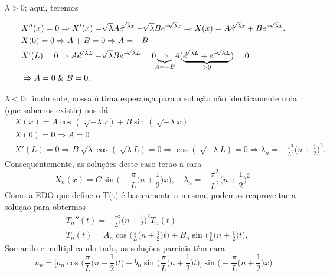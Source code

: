 \documentclass[../pde_notes.tex]{subfiles}
\begin{document}
\underline{\(\lambda > 0\)}: aqui, teremos

\begin{align*}
	 & X''(x) = 0 \Rightarrow X'(x) = \sqrt[]{\lambda }Ae^{\sqrt[]{\lambda }x} - \sqrt[]{\lambda }Be^{-\sqrt[]{\lambda }x} \Rightarrow X(x) = A e^{\sqrt[]{\lambda }x}+Be^{-\sqrt[]{\lambda }x}.                        \\
	 & X(0) = 0 \Rightarrow A + B = 0 \Rightarrow A = -B                                                                                                                                                                \\
	 & X'(L) = 0 \Rightarrow Ae^{\sqrt[]{\lambda }L} - \sqrt[]{\lambda }Be^{-\sqrt[]{\lambda }L} = 0 \underbrace{\Rightarrow }_{\mathclap{A=-B}}A(\underbrace{e^{\sqrt[]{\lambda }L}+e^{-\sqrt[]{\lambda }L}}_{>0}) = 0 \\
	 & \Rightarrow A=0 \;\&\; B = 0.
\end{align*}

\underline{\(\lambda < 0\)}: finalmente, nossa última esperança para a solução não identicamente nula (que sabemos existir) nos dá
\begin{align*}
	 & X(x) = A\cos^{}{(\sqrt[]{-\lambda }x)} + B \sin^{}{(\sqrt[]{-\lambda }x)}                                                                                                                                \\
	 & X(0) = 0 \Rightarrow A = 0                                                                                                                                                                               \\
	 & X'(L) = 0 \Rightarrow B\sqrt[]{\lambda }\cos^{}{(\sqrt[]{\lambda }L)} = 0 \Rightarrow \cos^{}{(\sqrt[]{-\lambda }L)}= 0 \Rightarrow \lambda_{n} = -\frac{\pi^{2}}{L^{2}}\biggl(n+\frac{1}{2}\biggr)^{2}.
\end{align*}
Consequentemente, as soluções deste caso terão a cara
\[
	X_{n}(x) = C \sin^{}{\biggl(-\frac{\pi}{L}\biggl(n+\frac{1}{2}\biggr)x\biggr)},\quad \lambda_{n} = -\frac{\pi^{2}}{L^{2}}\biggl(n+\frac{1}{2}\biggr)^{2}.
\]
Como a EDO que define o T(t) é basicamente a mesma, podemos reaproveitar a solução para obtermos
\begin{align*}
	 & T_{n}''(t) = -\frac{\pi^{2}}{L^{2}}\biggl(n+\frac{1}{2}\biggr)^{2}T_{n}(t)                                                                                \\
	 & T_{n}(t) = A_{n}\cos^{}{\biggl(\frac{\pi}{L}\biggl(n+\frac{1}{2}\biggr)t\biggr)} + B_{n}\sin^{}{\biggl(\frac{\pi}{L}\biggl(n+\frac{1}{2}\biggr)t\biggr)}.
\end{align*}
Somando e multiplicando tudo, as soluções parciais têm cara
\[
	u_{n} = \biggl[a_{n}\cos^{}{\biggl(\frac{\pi}{L}\biggl(n+\frac{1}{2}\biggr)t\biggr)} + b_{n}\sin^{}{\biggl(\frac{\pi}{L}\biggl(n+\frac{1}{2}\biggr)t\biggr)}\biggr]\sin^{}{\biggl(-\frac{\pi}{L}\biggl(n+\frac{1}{2}\biggr)x\biggr)}
\]
\end{document}
